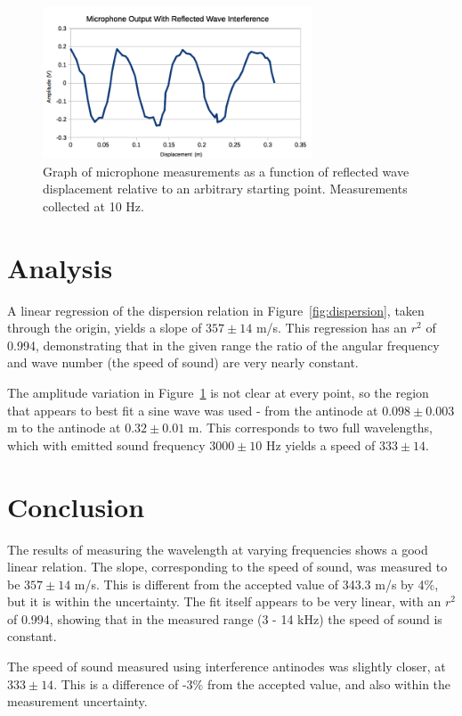 \documentclass[journal]{IEEEtran}
\begin{document}
\begin{figure}[ht!]
\centering
\includegraphics[width=80mm]{interference.png}
\caption{Graph of microphone measurements as a function of reflected wave
displacement relative to an arbitrary starting point. Measurements collected at
10 Hz.}
\label{fig:interference}
\end{figure}

\section{Analysis}

A linear regression of the dispersion relation in Figure~\ref{fig:dispersion},
taken through the origin, yields a slope of $357 \pm 14$ m/s. This regression
has an $r^2$ of 0.994, demonstrating that in the given range the ratio of the
angular frequency and wave number (the speed of sound) are very nearly
constant.

The amplitude variation in Figure~\ref{fig:interference} is not clear at every
point, so the region that appears to best fit a sine wave was used - from the
antinode at $0.098 \pm 0.003$ m to the antinode at $0.32 \pm 0.01$ m. This
corresponds to two full wavelengths, which with emitted sound frequency $3000
\pm 10$ Hz yields a speed of $333 \pm 14$.

\section{Conclusion}

The results of measuring the wavelength at varying frequencies shows a good
linear relation. The slope, corresponding to the speed of sound, was measured
to be $357 \pm 14$ m/s. This is different from the accepted value of 343.3 m/s
by 4\%, but it is within the uncertainty. The fit itself appears to be very
linear, with an $r^2$ of 0.994, showing that in the measured range (3 - 14 kHz)
the speed of sound is constant.

The speed of sound measured using interference antinodes was slightly closer,
at $333 \pm 14$. This is a difference of -3\% from the accepted value, and also
within the measurement uncertainty.
\end{document}
